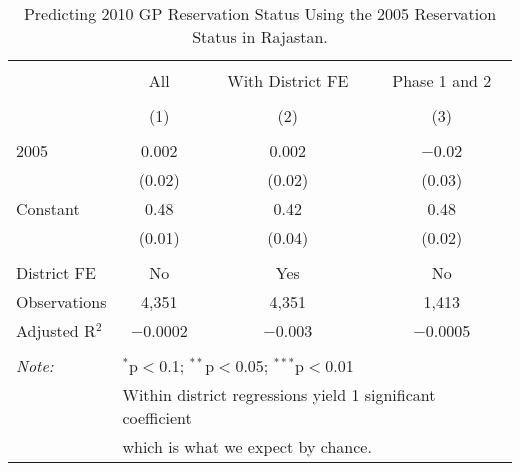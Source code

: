 
\begin{table}[!htbp] \centering 
  \caption{Predicting 2010 GP Reservation Status Using the 2005 Reservation Status in Rajastan.} 
  \label{rand_or_no_raj} 
\begin{tabular}{@{\extracolsep{5pt}}lccc} 
\\[-1.8ex]\hline 
\hline \\[-1.8ex] 
 & All & With District FE & Phase 1 and 2 \\ 
\\[-1.8ex] & (1) & (2) & (3)\\ 
\hline \\[-1.8ex] 
 2005 & 0.002 & 0.002 & $-$0.02 \\ 
  & (0.02) & (0.02) & (0.03) \\ 
  Constant & 0.48 & 0.42 & 0.48 \\ 
  & (0.01) & (0.04) & (0.02) \\ 
 \hline \\[-1.8ex] 
District FE & No & Yes & No \\ 
Observations & 4,351 & 4,351 & 1,413 \\ 
Adjusted R$^{2}$ & $-$0.0002 & $-$0.003 & $-$0.0005 \\ 
\hline 
\hline \\[-1.8ex] 
\textit{Note:}  & \multicolumn{3}{l}{$^{*}$p$<$0.1; $^{**}$p$<$0.05; $^{***}$p$<$0.01} \\ 
 & \multicolumn{3}{l}{Within district regressions yield 1 significant coefficient} \\ 
 & \multicolumn{3}{l}{which is what we expect by chance.} \\ 
\end{tabular} 
\end{table} 
